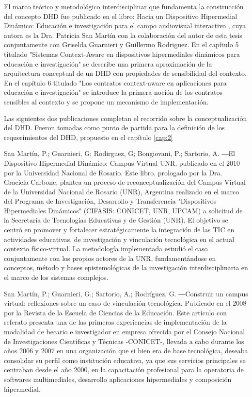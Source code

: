 El marco teórico y metodológico interdisciplinar que fundamenta la construcción del concepto DHD fue publicado en el
libro: Hacia un Dispositivo Hipermedial Dinámico:
Educación e investigación para el campo audiovisual interactivo
\cite{librounq}, cuya autora es la Dra. Patricia San Martín con la colaboración
del autor de esta tesis conjuntamente con Griselda Guarnieri y Guillermo
Rodriguez. En el capítulo 5 titulado "Sistemas Context-Aware en dispositivos
hipermediales dinámicos para educación e investigación" se describe una primera
aproximación de la arquitectura conceptual de un DHD con propiedades de
sensibilidad del contexto. En el capítulo 6 titulado "Los contratos
context-aware en aplicaciones para educación e investigación" se introduce la
primera noción de los contratos sensibles al contexto y se propone un mecanismo
de implementación. 

Las siguientes dos publicaciones completan el recorrido sobre
la conceptualización del DHD. Fueron tomadas como punto de partida para
la definición de los requerimientos del DHD, propuesto en el capítulo
\ref{cap:2} 

San Martín, P.; Guarnieri, G; Rodirguez, G; Bongiovani, P.; Sartorio, A. ―El
Dispositivo Hipermedial Dinámico: Campus Virtual UNR, publicado en el 2010 por
la Universidad Nacional de Rosario. Este libro, prologado por la Dra.
Graciela Carbone, plantea un proceso de reconceptualización del Campus Virtual
de la Universidad Nacional de Rosario (UNR), Argentina realizado en el marco del
Programa de Investigación, Desarrollo y Transferencia "Dispositivos
Hipermediales Dinámicos" (CIFASIS: CONICET, UNR, UPCAM) a solicitud de la
Secretaría de Tecnologías Educativas y de Gestión (UNR). El objetivo se centró
en promover y fortalecer estratégicamente la integración de las TIC
en actividades educativas, de investigación y vinculación tecnológica en el
actual contexto físico-virtual. La metodología implementada estudió el caso
conjuntamente con los propios actores de la UNR, fundamentándose en conceptos,
método y bases epistemológicas de la investigación interdisciplinaria en el
marco de los sistemas complejos.

San Martín, P.; Guarnieri, G.; Sartorio, A.; Rodríguez, G. ―Construir un campus
virtual: reflexiones sobre un caso de vinculación tecnológica. Publicado en el
2008 por la Revista de la Escuela de Ciencias de la Educación. Este artículo con referato
presenta una de las primeras experiencias de implementación de la modalidad de
becario e investigador en empresa ofrecida por el Consejo Nacional de
Investigaciones Científicas y Técnicas -CONICET-, llevada a cabo durante los
años 2006 y 2007 en una organización que si bien era de base tecnológica,
deseaba consolidar su perfil como institución educativa, ya que sus servicios
principales se centraban desde el año 2000, en la capacitación profesional para
la operatoria de softwares multimediales, desarrollo aplicaciones hipermediales
y composición hipermedial.


